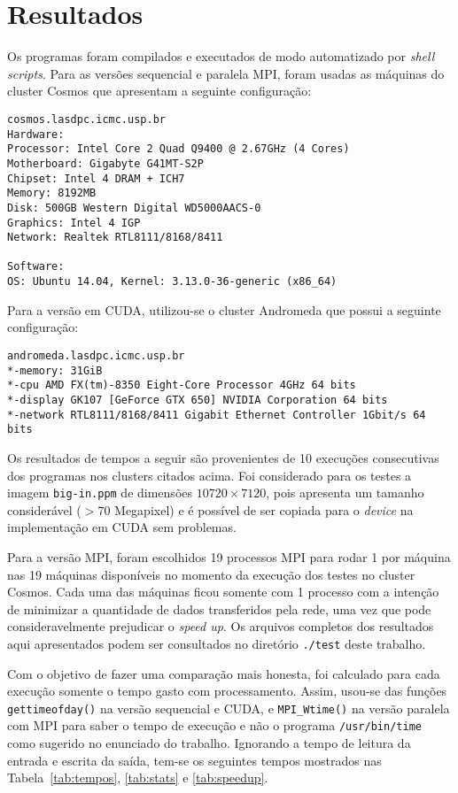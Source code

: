 \section{Resultados \label{sec:resultados}}

Os programas foram compilados e executados de modo automatizado por \emph{shell scripts}. Para as versões sequencial e paralela MPI, foram usadas as máquinas do cluster Cosmos que apresentam a seguinte configuração:

\begin{verbatim}cosmos.lasdpc.icmc.usp.br
Hardware:
Processor: Intel Core 2 Quad Q9400 @ 2.67GHz (4 Cores)
Motherboard: Gigabyte G41MT-S2P
Chipset: Intel 4 DRAM + ICH7
Memory: 8192MB
Disk: 500GB Western Digital WD5000AACS-0
Graphics: Intel 4 IGP
Network: Realtek RTL8111/8168/8411

Software:
OS: Ubuntu 14.04, Kernel: 3.13.0-36-generic (x86_64)
\end{verbatim}

Para a versão em CUDA, utilizou-se o cluster Andromeda que possui a seguinte configuração:

\begin{verbatim}andromeda.lasdpc.icmc.usp.br
*-memory: 31GiB
*-cpu AMD FX(tm)-8350 Eight-Core Processor 4GHz 64 bits
*-display GK107 [GeForce GTX 650] NVIDIA Corporation 64 bits
*-network RTL8111/8168/8411 Gigabit Ethernet Controller 1Gbit/s 64 bits
\end{verbatim}

Os resultados de tempos a seguir são provenientes de 10 execuções consecutivas dos programas nos clusters citados acima. Foi considerado para os testes a imagem \texttt{big-in.ppm} de dimensões $10720 \times 7120$, pois apresenta um tamanho considerável ($> 70$ Megapixel) e é possível de ser copiada para o \textit{device} na implementação em CUDA sem problemas.

Para a versão MPI, foram escolhidos 19 processos MPI para rodar 1 por máquina nas 19 máquinas disponíveis no momento da execução dos testes no cluster Cosmos. Cada uma das máquinas ficou somente com 1 processo com a intenção de minimizar a quantidade de dados transferidos pela rede, uma vez que pode consideravelmente prejudicar o \textit{speed up}. Os arquivos completos dos resultados aqui apresentados podem ser consultados no diretório \texttt{./test} deste trabalho.

Com o objetivo de fazer uma comparação mais honesta, foi calculado para cada execução somente o tempo gasto com processamento. Assim, usou-se das funções \texttt{gettimeofday()} na versão sequencial e CUDA, e \texttt{MPI\_Wtime()}  na versão paralela com MPI para saber o tempo de execução e não o programa \texttt{/usr/bin/time} como sugerido no enunciado do trabalho. Ignorando a tempo de leitura da entrada e escrita da saída, tem-se os seguintes tempos mostrados nas Tabela~\ref{tab:tempos}, \ref{tab:stats} e \ref{tab:speedup}.

